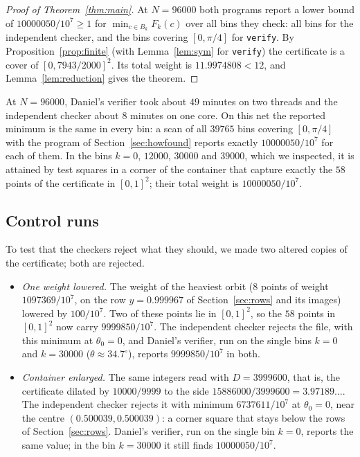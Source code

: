\documentclass[11pt]{amsart}
\theoremstyle{definition}
\theoremstyle{remark}
\newcommand{\sfrac}{7943/2000}          %
\newcommand{\Wdec}{11.9974808}
\newcommand{\minw}{10000050}             %
\newcommand{\whi}{1097369}
\begin{document}
\begin{proof}[Proof of Theorem~\ref{thm:main}]
At $N=96000$ both programs report a lower bound of $\minw/10^7\ge1$ for $\min_{c\in B_k}F_k(c)$ over all bins they check: all bins for the independent checker, and the bins covering $[0,\pi/4]$ for \texttt{verify}. By Proposition~\ref{prop:finite} (with Lemma~\ref{lem:sym} for \texttt{verify}) the certificate is a cover of $[0,\sfrac]^2$. Its total weight is $\Wdec<12$, and Lemma~\ref{lem:reduction} gives the theorem.
\end{proof}

At $N=96000$, Daniel's verifier took about $49$ minutes on two threads and the independent checker about $8$ minutes on one core. On this net the reported minimum is the same in every bin: a scan of all $39765$ bins covering $[0,\pi/4]$ with the program of Section~\ref{sec:howfound} reports exactly $\minw/10^7$ for each of them. In the bins $k=0$, $12000$, $30000$ and $39000$, which we inspected, it is attained by test squares in a corner of the container that capture exactly the $58$ points of the certificate in $[0,1]^2$; their total weight is $\minw/10^7$.

\subsection*{Control runs}
To test that the checkers reject what they should, we made two altered copies of the certificate; both are rejected.
\begin{itemize}
\item \emph{One weight lowered.} The weight of the heaviest orbit ($8$ points of weight $\whi/10^7$, on the row $y=0.999967$ of Section~\ref{sec:rows} and its images) lowered by $100/10^7$. Two of these points lie in $[0,1]^2$, so the $58$ points in $[0,1]^2$ now carry $9999850/10^7$. The independent checker rejects the file, with this minimum at $\theta_0=0$, and Daniel's verifier, run on the single bins $k=0$ and $k=30000$ ($\theta\approx34.7^\circ$), reports $9999850/10^7$ in both.
\item \emph{Container enlarged.} The same integers read with $D=3999600$, that is, the certificate dilated by $10000/9999$ to the side $15886000/3999600=3.97189\ldots$. The independent checker rejects it with minimum $6737611/10^7$ at $\theta_0=0$, near the centre $(0.500039,0.500039)$: a corner square that stays below the rows of Section~\ref{sec:rows}. Daniel's verifier, run on the single bin $k=0$, reports the same value; in the bin $k=30000$ it still finds $\minw/10^7$.
\end{itemize}
\end{document}

